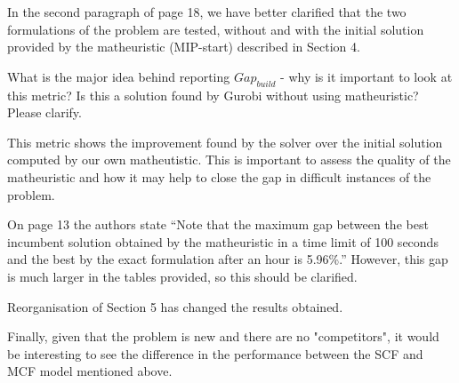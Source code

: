 \documentclass{article}
\newenvironment{reviewer}{\setcounter{pointcounter}{1}}{}
\newcommand{\point}{\text{{\selectfont \thepointcounter} \stepcounter{pointcounter}}}
\newcommand{\JP}[1]{{\color{black}#1}}
\begin{document}
\begin{reviewer}
		\begin{tcolorbox}[breakable,enhanced,coltitle=black,colback=green!5!white,colframe=green!75!black,title=\textbf{Answer R2.\point},borderline={1pt}{0pt}{black},boxrule=0pt]
			In the second paragraph of page 18, we have better clarified that the two formulations of the problem are tested, without and with the initial solution provided by the matheuristic (MIP-start) described in Section 4.
 		\end{tcolorbox}
		
		\begin{itshape}
			What is the major idea behind reporting $Gap_{build}$ - why is it important to look at this metric? Is this a solution found by Gurobi without using matheuristic? Please clarify.
		\end{itshape}

		\begin{tcolorbox}[breakable,enhanced,coltitle=black,colback=green!5!white,colframe=green!75!black,title=\textbf{Answer R2.\point},borderline={1pt}{0pt}{black},boxrule=0pt]
			\JP{This metric shows the improvement found by the solver over the initial solution computed by our own matheutistic. This is important to assess the quality of the matheuristic and how it may help to close the gap in difficult instances of the problem.}
		\end{tcolorbox}

		\begin{itshape}
			On page 13 the authors state ``Note that the maximum gap between the best incumbent solution obtained by the matheuristic in a time limit of 100 seconds and the best by the exact formulation after an hour is 5.96\%.'' However, this gap is much larger in the tables provided, so this should be clarified.
		\end{itshape}
  
		\begin{tcolorbox}[breakable,enhanced,coltitle=black,colback=green!5!white,colframe=green!75!black,title=\textbf{Answer R2.\point},borderline={1pt}{0pt}{black},boxrule=0pt]
            Reorganisation of Section 5 has changed the results obtained.
		\end{tcolorbox}
  
		\begin{itshape}
			Finally, given that the problem is new and there are no "competitors", it would be interesting to see the difference in the performance between the SCF and MCF model mentioned above.
		\end{itshape}
	

\end{reviewer}
\end{document}
